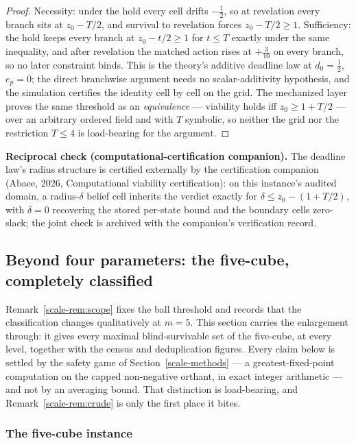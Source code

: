 \documentclass[10pt,twocolumn]{article}
\theoremstyle{plain}
\theoremstyle{definition}
\theoremstyle{remark}
\begin{document}
\begin{proof}
Necessity: under the hold every cell drifts \(-\tfrac12\), so at
revelation every branch sits at \(z_{0} - T/2\), and survival to
revelation forces \(z_{0} - T/2 \ge 1\). Sufficiency: the hold keeps
every branch at \(z_{0} - t/2 \ge 1\) for \(t \le T\) exactly
under the same inequality, and after revelation the matched action
rises at \(+\tfrac3{10}\) on every branch, so no later constraint
binds. This is the theory's additive deadline law at
\(d_{0} = \tfrac12\), \(e_{p} = 0\); the direct branchwise argument
needs no scalar-additivity hypothesis, and the simulation certifies
the identity cell by cell on the grid. The mechanized layer proves
the same threshold as an \emph{equivalence} --- viability holds iff
\(z_{0} \ge 1 + T/2\) --- over an arbitrary ordered field and with
\(T\) symbolic, so neither the grid nor the restriction
\(T \le 4\) is load-bearing for the argument.
\end{proof}

\medskip
\noindent\textbf{Reciprocal check (computational-certification
companion).} The deadline law's radius structure is certified
externally by the certification companion (Abaee, 2026, Computational viability certification): on this
instance's audited domain, a radius-\(\delta\) belief cell inherits
the verdict exactly for \(\delta \le z_{0} - (1 + T/2)\), with
\(\delta = 0\) recovering the stored per-state bound and the
boundary cells zero-slack; the joint check is archived with the
companion's verification record.

\subsection{Beyond four parameters: the five-cube, completely classified}
\label{scale-fivecube}

Remark~\ref{scale-rem:scope} fixes the ball threshold and records that the classification changes
qualitatively at \(m = 5\). This section carries the enlargement through: it gives every
maximal blind-survivable set of the five-cube, at every level, together with the census and
deduplication figures. Every claim below is settled by the safety game of
Section~\ref{scale-methods} --- a greatest-fixed-point computation on the capped non-negative
orthant, in exact integer arithmetic --- and not by an averaging bound. That distinction is
load-bearing, and Remark~\ref{scale-rem:crude} is only the first place it bites.

\subsubsection{The five-cube instance}
\end{document}
